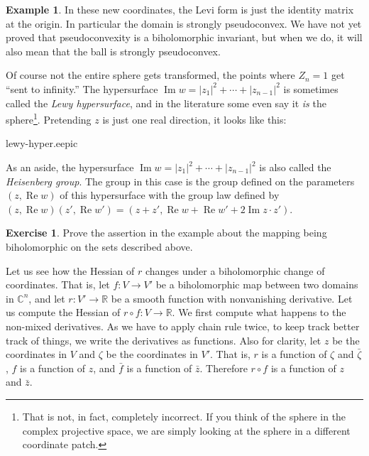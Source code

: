 \documentclass[12pt,openany]{book}
\renewcommand{\Re}{\operatorname{Re}}
\renewcommand{\Im}{\operatorname{Im}}
\newcommand{\sabs}[1]{\lvert {#1} \rvert}
\newcommand{\C}{{\mathbb{C}}}
\newcommand{\R}{{\mathbb{R}}}
\newcommand{\myindex}[1]{#1\index{#1}}
\theoremstyle{plain}
\theoremstyle{remark}
\theoremstyle{definition}
\newenvironment{exbox}{%
    \def\FrameCommand{\vrule width 1pt \relax\hspace {10pt}}%
    \MakeFramed {\advance \hsize -\width \FrameRestore }%
}{%
    \endMakeFramed
}
\newenvironment{myfig}{%
    \begin{center}
}{%
    \end{center}
}
\theoremstyle{exercise}
\newtheorem{exercise}{Exercise}[section]
\theoremstyle{example}
\newtheorem{example}[thm]{Example}
\begin{document}
\begin{example}
In these new coordinates, the Levi form is just the identity matrix at the
origin.  In particular the domain is strongly pseudoconvex.
We have not yet proved that pseudoconvexity is a biholomorphic invariant,
but when we do, it will also mean that the ball is strongly pseudoconvex.

Of course not the entire sphere gets transformed, the points where $Z_n=1$
get ``sent to infinity.''
The hypersurface $\Im w = \sabs{z_1}^2 + \cdots + \sabs{z_{n-1}}^2$
is sometimes called the \emph{\myindex{Lewy hypersurface}}, and in the
literature some even say it \emph{is} the sphere\footnote{That is not, in
fact, completely incorrect.
If you think of the sphere in the complex projective space,
we are simply looking at the sphere in a different coordinate patch.}.
Pretending $z$ is just one real direction, it looks like this:

\begin{myfig}
{lewy-hyper.eepic}
\end{myfig}

As an aside,
the hypersurface 
$\Im w = \sabs{z_1}^2 + \cdots + \sabs{z_{n-1}}^2$ is also called the
\emph{\myindex{Heisenberg group}}.  The group in this case
is the group defined on the parameters $(z,\Re w)$ of this hypersurface with the
group law defined by $(z,\Re w)(z',\Re w') =
(z+z',\Re w + \Re w' + 2 \Im z \cdot z')$.
\end{example}

\begin{exbox}
\begin{exercise}
Prove the assertion in the example about the mapping being biholomorphic
on the sets described above.
\end{exercise}
\end{exbox}

Let us see how the Hessian of $r$ changes under a biholomorphic change
of coordinates.  That is, let $f \colon V \to V'$ be a biholomorphic map
between two domains in $\C^n$, and let $r \colon V' \to \R$ be a smooth
function with nonvanishing derivative.  Let us compute the Hessian of
$r \circ f \colon V \to \R$.
We first compute what happens to the non-mixed derivatives.
As we have to apply chain rule twice, to keep track better track of things,
we write the
derivatives as functions.  Also for clarity, let $z$ be the coordinates in $V$
and $\zeta$ be the coordinates in $V'$.
That is, $r$ is a function of $\zeta$ and $\bar{\zeta}$,
$f$ is a function of $z$, and $\bar{f}$ is a function of $\bar{z}$.
Therefore $r \circ f$ is a function of $z$ and $\bar{z}$.
\end{document}
